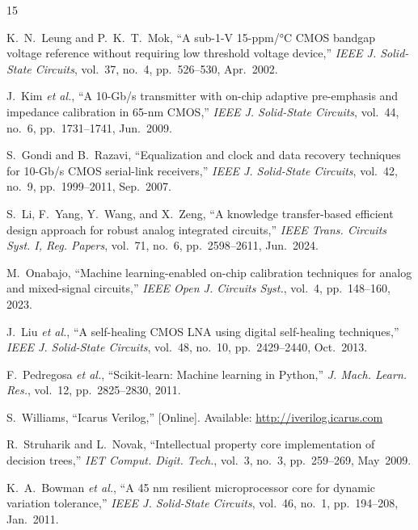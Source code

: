 \documentclass[lettersize,journal]{IEEEtran}
\begin{document}
\begin{thebibliography}{15}


K.~N.~Leung and P.~K.~T.~Mok, ``A sub-1-V 15-ppm/°C CMOS bandgap voltage reference without requiring low threshold voltage device,'' \textit{IEEE J. Solid-State Circuits}, vol.~37, no.~4, pp.~526--530, Apr.~2002.

J.~Kim \textit{et al.}, ``A 10-Gb/s transmitter with on-chip adaptive pre-emphasis and impedance calibration in 65-nm CMOS,'' \textit{IEEE J. Solid-State Circuits}, vol.~44, no.~6, pp.~1731--1741, Jun.~2009.

S.~Gondi and B.~Razavi, ``Equalization and clock and data recovery techniques for 10-Gb/s CMOS serial-link receivers,'' \textit{IEEE J. Solid-State Circuits}, vol.~42, no.~9, pp.~1999--2011, Sep.~2007.

S.~Li, F.~Yang, Y.~Wang, and X.~Zeng, ``A knowledge transfer-based efficient design approach for robust analog integrated circuits,'' \textit{IEEE Trans. Circuits Syst. I, Reg. Papers}, vol.~71, no.~6, pp.~2598--2611, Jun.~2024.

M.~Onabajo, ``Machine learning-enabled on-chip calibration techniques for analog and mixed-signal circuits,'' \textit{IEEE Open J. Circuits Syst.}, vol.~4, pp.~148--160, 2023.

J.~Liu \textit{et al.}, ``A self-healing CMOS LNA using digital self-healing techniques,'' \textit{IEEE J. Solid-State Circuits}, vol.~48, no.~10, pp.~2429--2440, Oct.~2013.

F.~Pedregosa \textit{et al.}, ``Scikit-learn: Machine learning in Python,'' \textit{J. Mach. Learn. Res.}, vol.~12, pp.~2825--2830, 2011.

S.~Williams, ``Icarus Verilog,'' [Online]. Available: \url{http://iverilog.icarus.com}

R.~Struharik and L.~Novak, ``Intellectual property core implementation of decision trees,'' \textit{IET Comput. Digit. Tech.}, vol.~3, no.~3, pp.~259--269, May~2009.

K.~A.~Bowman \textit{et al.}, ``A 45 nm resilient microprocessor core for dynamic variation tolerance,'' \textit{IEEE J. Solid-State Circuits}, vol.~46, no.~1, pp.~194--208, Jan.~2011.


\end{thebibliography}
\end{document}
